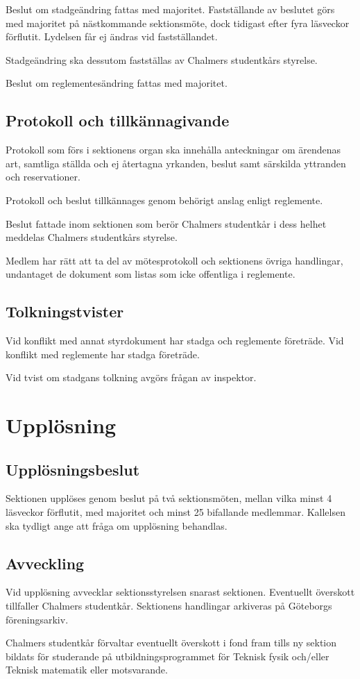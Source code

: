 \documentclass{styrdokument}
\begin{document}
\? Beslut om stadgeändring fattas med  majoritet.
Fastställande av beslutet görs med  majoritet på nästkommande sektionsmöte, dock tidigast efter fyra läsveckor förflutit.
Lydelsen får ej ändras vid fastställandet.
\label{beslut.stadgeandring}

\? Stadgeändring ska dessutom fastställas av Chalmers studentkårs styrelse.

\? Beslut om reglementesändring fattas med  majoritet.
\label{beslut.reglementesandring}

\subsection{Protokoll och tillkännagivande} \label{protokoll}

\? Protokoll som förs i sektionens organ ska innehålla anteckningar om ärendenas art, samtliga ställda och ej återtagna yrkanden, beslut samt särskilda yttranden och reservationer.

\? Protokoll och beslut tillkännages genom behörigt anslag enligt reglemente.

\? Beslut fattade inom sektionen som berör Chalmers studentkår i dess helhet meddelas Chalmers studentkårs styrelse.

\? Medlem har rätt att ta del av mötesprotokoll och sektionens övriga handlingar, undantaget de dokument som listas som icke offentliga i reglemente.
\label{ratt.offentlighet}

\subsection{Tolkningstvister}

\? Vid konflikt med annat styrdokument har stadga och reglemente företräde.
Vid konflikt med reglemente har stadga företräde.

\? Vid tvist om stadgans tolkning avgörs frågan av inspektor.

\section{Upplösning}
\subsection{Upplösningsbeslut}

\? Sektionen upplöses genom beslut på två sektionsmöten, mellan vilka minst 4 läsveckor förflutit, med  majoritet och minst 25 bifallande medlemmar.
Kallelsen ska tydligt ange att fråga om upplösning behandlas.
\label{beslut.upplosning}

\subsection{Avveckling}

\? Vid upplösning avvecklar sektionsstyrelsen snarast sektionen.
Eventuellt överskott tillfaller Chalmers studentkår.
Sektionens handlingar arkiveras på Göteborgs föreningsarkiv.

\? Chalmers studentkår förvaltar eventuellt överskott i fond fram tills ny sektion bildats för studerande på utbildningsprogrammet för Teknisk fysik och/eller Teknisk matematik eller motsvarande.
\end{document}
